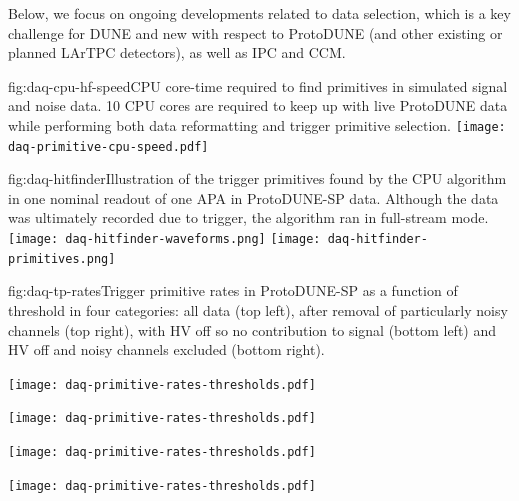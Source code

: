 Below, we focus on ongoing developments related to
data selection, which is a key challenge for DUNE and new with respect
to ProtoDUNE (and other existing or planned LArTPC detectors), as well
as IPC and CCM.

\begin{dunefigure}{fig:daq-cpu-hf-speed}{CPU core-time required to find primitives in simulated signal and noise data.  10 CPU cores are required to keep up with live ProtoDUNE data while performing both data reformatting and trigger primitive selection.}
  \texttt{[image: daq-primitive-cpu-speed.pdf]}
\end{dunefigure}

\begin{dunefigure}{fig:daq-hitfinder}{Illustration of the trigger primitives found by the CPU algorithm in one nominal readout of one APA in ProtoDUNE-SP data.  Although the data was ultimately recorded due to trigger, the algorithm ran in full-stream mode.}
    \texttt{[image: daq-hitfinder-waveforms.png]}%
    \texttt{[image: daq-hitfinder-primitives.png]}
\end{dunefigure}

\begin{dunefigure}{fig:daq-tp-rates}{Trigger primitive rates in ProtoDUNE-SP as a function of threshold in four categories: all data (top left),  after removal of particularly noisy channels (top right), with HV off so no contribution to signal (bottom left) and HV off and noisy channels excluded (bottom right).}
  \begin{minipage}[b]{0.5\linewidth}
    \begin{center}
      \texttt{[image: daq-primitive-rates-thresholds.pdf]}

      \texttt{[image: daq-primitive-rates-thresholds.pdf]}
    \end{center}
  \end{minipage}%
  \begin{minipage}[b]{0.5\linewidth}
    \begin{center}
      \texttt{[image: daq-primitive-rates-thresholds.pdf]}

      \texttt{[image: daq-primitive-rates-thresholds.pdf]}
    \end{center}
  \end{minipage}

\end{dunefigure}


